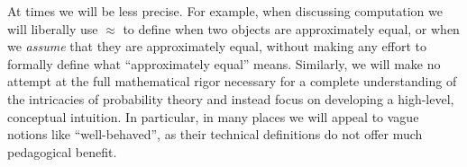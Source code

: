 At times we will be less precise.  For example, when discussing computation
we will liberally use $\approx$ to define when two objects are approximately
equal, or when we \emph{assume} that they are approximately equal, without
making any effort to formally define what ``approximately equal'' means.
Similarly, we will make no attempt at the full mathematical rigor necessary for
a complete understanding of the intricacies of probability theory and instead
focus on developing a high-level, conceptual intuition.  In particular, in many
places we will appeal to vague notions like ``well-behaved'', as their technical
definitions do not offer much pedagogical benefit.

